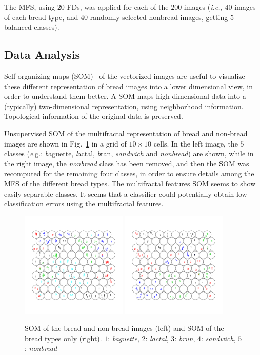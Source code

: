 The MFS, using $20$ FDs, was applied for each of the $200$ images ({\em i.e.,} $40$ images of each bread type, and $40$ randomly selected nonbread images, getting $5$ balanced classes).

\subsection{Data Analysis}
\label{sec:11}

Self-organizing maps (SOM)~\cite{Kohonen2001} of the vectorized images are useful to visualize these different representation of bread images into a lower dimensional view, in order to understand them better. A SOM maps high dimensional data into a (typically) two-dimensional representation, using neighborhood information. Topological information of the original data is preserved.  

Unsupervised SOM of the multifractal representation of bread and non-bread images are shown in Fig.~\ref{fig:somfractal} in a grid of $10\times10$ cells. In the left image, the $5$ classes ({\emph e.g.}: {\emph baguette}, {\emph lactal}, {\emph bran}, {\em sandwich} and {\em nonbread}) are shown, while in the right image, the {\em nonbread} class has been removed, and then the SOM was recomputed for the remaining four classes, in order to ensure details among the MFS of the different bread types. The multifractal features SOM seems to show easily separable classes. It seems that a classifier could potentially obtain low classification errors using the multifractal features.
\begin{figure}
\begin{centering}
\includegraphics[width=0.45\textwidth]{../exps/som/sommultifractal}
\includegraphics[width=0.45\textwidth]{../exps/som/sombreadmultifractal}
\caption{SOM of the bread and non-bread images (left) and SOM of the bread types only (right). $1$: {\em baguette}, $2$: {\em lactal}, $3$: {\em brun}, $4$: {\em sandwich}, $5$: {\em nonbread} }
\label{fig:somfractal}
\end{centering}
\end{figure}

